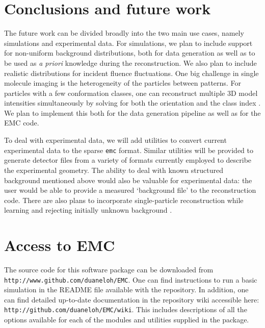 \documentclass[]{iucr}              %
\begin{document}
     
\section{Conclusions and future work}

The future work can be divided broadly into the two main use cases, namely simulations and experimental data. For simulations, we plan to include support for non-uniform background distributions, both for data generation as well as to be used as \emph{a priori} knowledge during the reconstruction. We also plan to include realistic distributions for incident fluence fluctuations. One big challenge in single molecule imaging is the heterogeneity of the particles between patterns. For particles with a few conformation classes, one can reconstruct multiple 3D model intensities simultaneously by solving for both the orientation and the class index \cite{Loh2012a}. We plan to implement this both for the data generation pipeline as well as for the EMC code.

To deal with experimental data, we will add utilities to convert current experimental data to the sparse \texttt{emc} format. Similar utilities will be provided to generate detector files from a variety of formats currently employed to describe the experimental geometry. The ability to deal with known structured background mentioned above would also be valuable for experimental data: the user would be able to provide a measured `background file' to the reconstruction code. There are also plans to incorporate single-particle reconstruction while learning and rejecting initially unknown background \cite{Loh2014}.

     
\section{Access to EMC} \label{sec:access}

The source code for this software package can be downloaded from \texttt{http://www.github.com/duaneloh/EMC}. One can find instructions to run a basic simulation in the README file available with the repository. In addition, one can find detailed up-to-date documentation in the repository wiki accessible here: \texttt{http://github.com/duaneloh/EMC/wiki}. This includes descriptions of all the options available for each of the modules and utilities supplied in the package.
\end{document}
